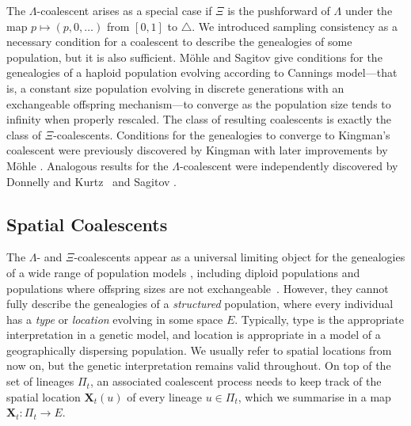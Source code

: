 \documentclass[reqno,draft]{amsart}
\numberwithin{equation}{section}
\theoremstyle{plain}
\theoremstyle{remark}
\newcommand{\fpart}{\Pi} %
\begin{document}
The $\Lambda$-coalescent arises as a special case if $\Xi$ is the pushforward of $\Lambda$ under the map $p \mapsto (p,0,\ldots )$ from $[0,1]$ to $\triangle$. We introduced sampling consistency as a necessary condition for a coalescent to describe the genealogies of some population, but it is also sufficient. M\"ohle and Sagitov \cite{haploid,sagitovxi2} give %
conditions for the genealogies of a haploid population evolving according to Cannings model---that is, a constant size population evolving in discrete generations with an exchangeable offspring mechanism---to converge as the population size tends to infinity when properly rescaled. The class of resulting coalescents is exactly the class of $\Xi$-coalescents.
Conditions for the genealogies to converge to Kingman's coalescent were previously discovered by Kingman \cite{kingman1982b} with later improvements by M\"ohle \cite{moehle98,moehle99}. Analogous results for the $\Lambda$-coalescent were independently discovered by Donnelly and Kurtz~\cite{DK99} and Sagitov \cite{sagitovlambda}.


\subsection{Spatial Coalescents}\label{sec:spatialcoalintro}
The $\Lambda$- and $\Xi$-coalescents %
appear as a universal limiting object for the genealogies of a wide range of population models %
\cite{bbschweinsberg,xiexamples1,schweinsbergGW,xiexamples2,xiexamples3,lambdadormancy}, including diploid populations \cite{diploid1,diploid2,diploid3} and populations where offspring sizes are not exchangeable~\cite{xicanningsnotexchangeable}.
However, they cannot fully describe the genealogies of a \emph{structured} population, where every individual has a \emph{type} or \emph{location} evolving in some space $E$. Typically, type is the appropriate interpretation in a genetic model, and location is appropriate in a model of a geographically dispersing population. We usually refer to spatial locations from now on, but the genetic interpretation remains valid throughout.
On top of the set of lineages $\fpart_t$, an associated coalescent process needs to keep track of the spatial location $\boldsymbol X_t(u)$ of every lineage $u\in \fpart_t$, which we summarise in a map $\boldsymbol X_t\colon \fpart_t \to E$.
\end{document}

